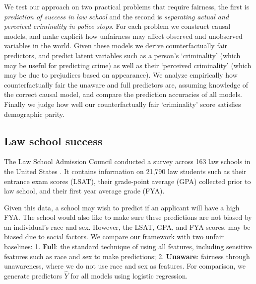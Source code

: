 We test our approach on two practical problems that require fairness, the first is \emph{prediction of success in law school} and the second is \emph{separating actual and perceived criminality in police stops}. For each problem we construct causal models, and make explicit how unfairness may affect observed and unobserved variables in the world. Given these models we derive counterfactually fair predictors, and predict latent variables such as a person's `criminality' (which may be useful for predicting crime) as well as their `perceived criminality' (which may be due to prejudices based on appearance). We analyze empirically how counterfactually fair the unaware and full predictors are, assuming knowledge of the correct causal model, and compare the prediction accuracies of all models. Finally we judge how well our counterfactually fair `criminality' score satisfies demographic parity.



\subsection{Law school success}
\label{sec:law-school-success}
The Law School Admission Council
conducted a survey across 163 law
schools in the United States \cite{wightman1998lsac}. %
It contains information on 21,790 law students such as their entrance exam scores (LSAT), their grade-point
average (GPA) collected prior to law school, and their first year average grade
(FYA). %

Given this data, a school may wish to predict if an applicant will
have a high FYA. %
The school would also like to make sure these
predictions are not biased by an individual's race and sex. However,
the LSAT, GPA, and FYA scores, may be biased due to social factors. %
We compare our framework with
two unfair baselines: 1. \textbf{Full}: the standard technique of
using all features, including sensitive features such as race and sex
to make predictions; 2. \textbf{Unaware}: fairness through
unawareness, where we do not use race and sex as features. For comparison, we generate predictors $\hat Y$ for all models using logistic regression.



